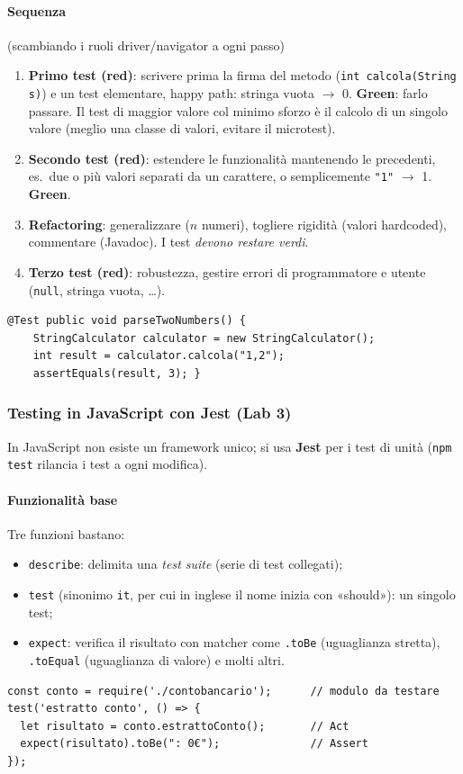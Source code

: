 \documentclass[a4paper,12pt]{article}
\begin{document}
\paragraph{Sequenza} (scambiando i ruoli driver/navigator a ogni passo)
\begin{enumerate}[nosep]
  \item \textbf{Primo test (red)}: scrivere prima la firma del metodo
        (\texttt{int calcola(String s)}) e un test elementare, happy path: stringa vuota
        $\to$ 0. \textbf{Green}: farlo passare. Il test di maggior valore col minimo sforzo
        è il calcolo di un singolo valore (meglio una classe di valori, evitare il
        microtest).
  \item \textbf{Secondo test (red)}: estendere le funzionalità mantenendo le precedenti, es.\
        due o più valori separati da un carattere, o semplicemente \texttt{"1"} $\to$ 1.
        \textbf{Green}.
  \item \textbf{Refactoring}: generalizzare ($n$ numeri), togliere rigidità (valori
        hardcoded), commentare (Javadoc). I test \emph{devono restare verdi}.
  \item \textbf{Terzo test (red)}: robustezza, gestire errori di programmatore e utente
        (\texttt{null}, stringa vuota, \dots).
\end{enumerate}
\begin{verbatim}
@Test public void parseTwoNumbers() {
    StringCalculator calculator = new StringCalculator();
    int result = calculator.calcola("1,2");
    assertEquals(result, 3); }
\end{verbatim}

\subsubsection{Testing in JavaScript con Jest (Lab 3)}
In JavaScript non esiste un framework unico; si usa \textbf{Jest} per i test di unità
(\texttt{npm test} rilancia i test a ogni modifica).

\paragraph{Funzionalità base} Tre funzioni bastano:
\begin{itemize}[nosep]
  \item \texttt{describe}: delimita una \emph{test suite} (serie di test collegati);
  \item \texttt{test} (sinonimo \texttt{it}, per cui in inglese il nome inizia con
        «should»): un singolo test;
  \item \texttt{expect}: verifica il risultato con matcher come \texttt{.toBe} (uguaglianza
        stretta), \texttt{.toEqual} (uguaglianza di valore) e molti altri.
\end{itemize}
\begin{verbatim}
const conto = require('./contobancario');      // modulo da testare
test('estratto conto', () => {
  let risultato = conto.estrattoConto();       // Act
  expect(risultato).toBe(": 0€");              // Assert
});
\end{verbatim}
\end{document}
